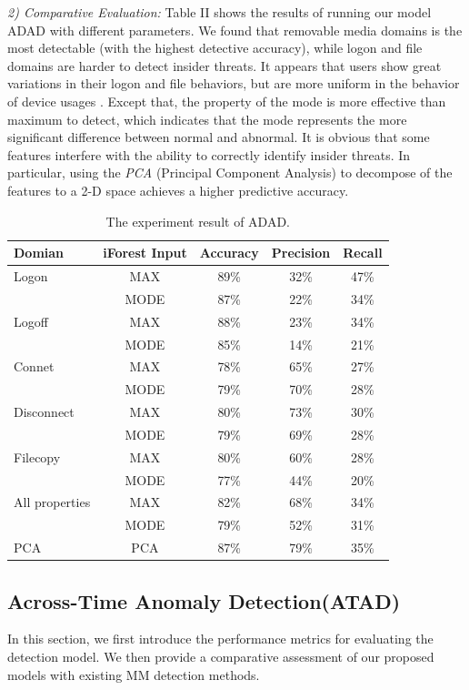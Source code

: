 \documentclass[conference]{IEEEtran}
\begin{document}
\emph{2) Comparative Evaluation:} Table II shows the results of running our model ADAD with different parameters.
We found that removable media domains is the most detectable (with the highest detective accuracy), while logon and file domains are harder to detect insider threats. It appears that users show great variations in their logon and file behaviors, but are more uniform in the behavior of device usages . Except that, the property of the mode is more effective than maximum to detect, which indicates that the mode represents the more significant difference between normal and abnormal. It is obvious that some features interfere with the ability to correctly identify insider threats. In particular, using the \emph{PCA} (Principal Component Analysis) to decompose of the features to a 2-D space achieves a higher predictive accuracy.


\begin{table}[tbp]
\caption{The experiment result of ADAD.}
\centering  %
\begin{tabular}{lcccc}  %
\hline
Domian  &iForest Input &Accuracy &Precision &Recall\\ \hline
	
Logon 	& MAX &89\% &32\% &47\%\\
  & MODE &87\% &22\% &34\%\\\hline
Logoff 	& MAX &88\% &23\% &34\%\\
   & MODE &85\% &14\% &21\%\\\hline
Connet 	& MAX &78\% &65\% &27\%\\
  & MODE &79\% &70\% &28\%\\\hline
Disconnect 	& MAX &80\% &73\% &30\%\\
  & MODE &79\% &69\% &28\%\\\hline
Filecopy 	& MAX &80\% &60\% &28\%\\
  & MODE &77\% &44\% &20\%\\\hline
All properties 	& MAX &82\% &68\% &34\%\\
  & MODE &79\% &52\% &31\%\\\hline
PCA 	&PCA  &87\% &79\% &35\%\\\hline

\end{tabular}

\end{table}


\subsection{Across-Time Anomaly Detection(ATAD)}
In this section, we first introduce the performance metrics for
evaluating the detection model. We then provide a
comparative assessment of our proposed models with existing MM detection methods.
\end{document}
